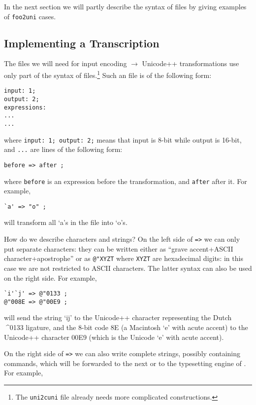 \documentclass[a4paper,11pt]{article}
\begin{document}
In the next section we will partly describe the syntax of \OTP{} files
by giving examples of \texttt{foo2uni} cases.

\subsection{Implementing a Transcription}

The \OTP{} files we will need for input encoding $\to$ Unicode++
transformations use only part of the syntax of \OTP{}
files.\footnote{The \texttt{uni2cuni} \OTP{} file already needs more
complicated constructions.}  Such an \OTP{} file is of the following
form:

\begin{verbatim}
input: 1;
output: 2;
expressions:
...
...
\end{verbatim}

\noindent where \texttt{input: 1; output: 2;} means that input is
8-bit while output is 16-bit, and \texttt{...} are lines of the
following form:

\begin{verbatim}
before => after ;
\end{verbatim}

\noindent where \texttt{before} is an expression before the
transformation, and \texttt{after} after it.  For example,

\begin{verbatim}
`a' => "o" ;
\end{verbatim}

\noindent will transform all `a's in the file into `o's. 

How do we describe characters and strings? On the left side of
\texttt{=>} we can only put separate characters: they can be written
either as ``grave accent+ASCII character+apostrophe'' or as
\texttt{@"XYZT} where \texttt{XYZT} are hexadecimal digits: in this
case we are not restricted to ASCII characters. The latter syntax can
also be used on the right side. For example,

\begin{verbatim}
`i'`j' => @"0133 ;
@"008E => @"00E9 ;
\end{verbatim}

\noindent will send the string `ij' to the Unicode++ character
representing the Dutch ^^^^0133 ligature, and the 8-bit code 8E (a
Macintosh `e' with acute accent) to the Unicode++ character 00E9
(which is the Unicode `e' with acute accent).

On the right side of \texttt{=>} we can also write complete strings,
possibly containing \OMEGA{} commands, which will be forwarded to the
next \OTP{} or to the typesetting engine of \OMEGA. For example,
\end{document}
